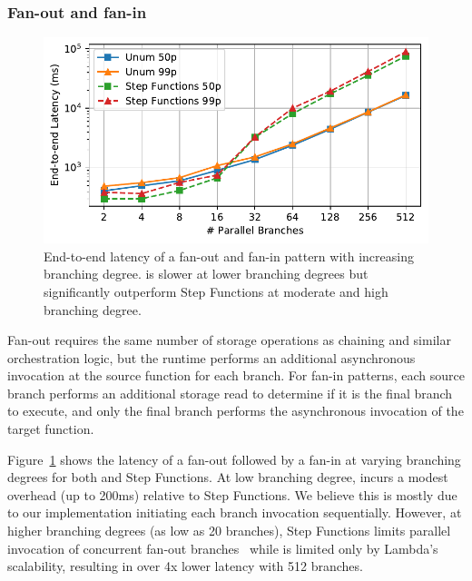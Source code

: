 \subsubsection{Fan-out and fan-in}\label{sec:eval:fan-out}

\begin{figure}[t]
  \centering
  \includegraphics[width=\columnwidth]{figures/MapMicroLatency.pdf}
  \caption{End-to-end latency of a fan-out and fan-in pattern with increasing
branching degree. \name{} is slower at lower branching degrees but significantly
outperform Step Functions at moderate and high branching degree.}
  \label{fig:mapmicrolatency}
\end{figure}

Fan-out requires the same number of storage operations as chaining and similar
orchestration logic, but the \name{} runtime performs an additional asynchronous
invocation at the source function for each branch. For fan-in patterns, each
source branch performs an additional storage read to determine if it is the
final branch to execute, and only the final branch performs the asynchronous
invocation of the target function.


Figure~\ref{fig:mapmicrolatency} shows the latency of a fan-out followed by a
fan-in at varying branching degrees for both \name{} and Step Functions. At
low branching degree, \name{} incurs a modest overhead (up to 200ms) relative
to Step Functions. We believe this is mostly due to our implementation
initiating each branch invocation sequentially. However, at higher branching
degrees (as low as 20 branches), Step Functions limits parallel invocation of
concurrent fan-out branches~\cite{aws-step-functions-map-state} while \name{}
is limited only by Lambda's scalability, resulting in over 4x lower latency
with 512 branches.

